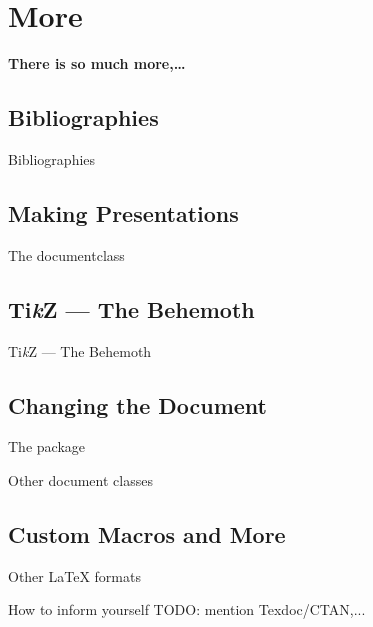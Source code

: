 \section{More}

\begin{frame}[plain,c]{}
   \vspace*{4em}\centering\Huge\bfseries There is so much more,\ldots
\end{frame}


\subsection{Bibliographies}

\begin{frame}{Bibliographies}
\end{frame}

\subsection{Making Presentations}
\begin{frame}{The  documentclass}

\end{frame}

\subsection{Ti\textit{k}Z --- The Behemoth}
\begin{frame}{Ti\textit{k}Z --- The Behemoth}

\end{frame}

\subsection{Changing the Document}
\begin{frame}{The  package}

\end{frame}

\begin{frame}{Other document classes}

\end{frame}

\subsection{Custom Macros and More}
\begin{frame}

\end{frame}

\begin{frame}{Other \LaTeX{} formats}

\end{frame}


\begin{frame}{How to inform yourself}
TODO: mention Texdoc/CTAN,...
\end{frame}
